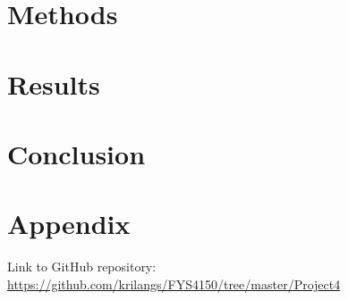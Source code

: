 \documentclass[12pt,a4paper,english]{article}
\begin{document}
\section{Methods}
\section{Results}
\section{Conclusion}
\appendix
\section{Appendix}
\label{sect:appendix}
Link to GitHub repository:\\
\url{https://github.com/krilangs/FYS4150/tree/master/Project4}



\end{document}
